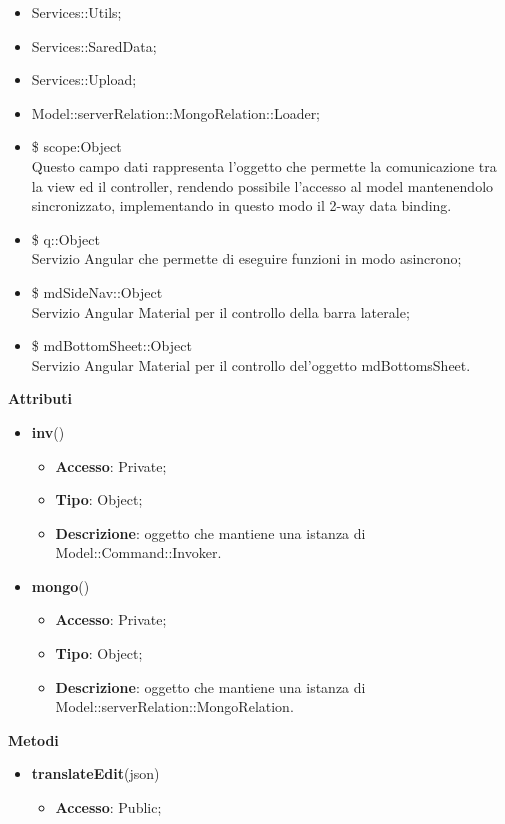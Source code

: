 {{\begin{itemize}
		\item Services::Utils;
		\item Services::SaredData;
		\item Services::Upload;
		\item Model::\-serverRelation::\-MongoRelation::\-Loader;
		\item \$ scope:Object\\
			\indent Questo campo dati rappresenta l’oggetto che permette la comunicazione tra la view ed il controller, rendendo possibile l’accesso al model mantenendolo sincronizzato, implementando in questo modo il 2-way data binding.
		\item \$ q::Object\\
			\indent Servizio Angular che permette di eseguire funzioni in modo asincrono;
		\item \$ mdSideNav::Object\\
			\indent Servizio Angular Material per il controllo della barra laterale;
		\item \$ mdBottomSheet::Object\\
			\indent Servizio Angular Material per il controllo del'oggetto mdBottomsSheet.
	\end{itemize}
	\textbf{Attributi}\\
	\begin{itemize}
		\item \textbf{inv}()
		\begin{itemize}
			\item \textbf{Accesso}: Private;
			\item \textbf{Tipo}: Object;
			\item \textbf{Descrizione}: oggetto che mantiene una istanza di Model::\-Command::\-Invoker.
		\end{itemize}
		\item \textbf{mongo}()
		\begin{itemize}
			\item \textbf{Accesso}: Private;
			\item \textbf{Tipo}: Object;
			\item \textbf{Descrizione}: oggetto che mantiene una istanza di Model::\-serverRelation::\-MongoRelation.
		\end{itemize}
    \end{itemize}
	\textbf{Metodi}
	\begin{itemize}
		\item \textbf{translateEdit}(json)
		\begin{itemize}
			\item \textbf{Accesso}: Public;

\end{itemize}
\end{itemize}}}
